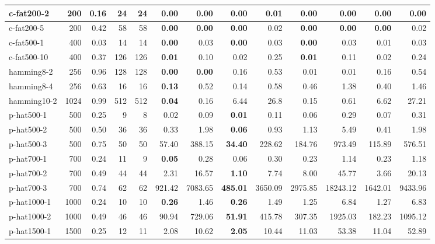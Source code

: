 \begin{table}
{\begin{tabular}{|l|r|r|r|r|r|r|r|r||r|r|r|r|}
    c-fat200-2 & 200 &0.16& 24 & 24&\textbf{0.00} & \textbf{0.00} & \textbf{0.00} & 0.01 & \textbf{0.00} & \textbf{0.00} & \textbf{0.00} & \textbf{0.00} \\ \hline
    c-fat200-5 & 200 &0.42& 58 & 58&\textbf{0.00} & \textbf{0.00} & \textbf{0.00} & 0.02 & \textbf{0.00} & \textbf{0.00} & \textbf{0.00} & 0.02 \\ \hline
    c-fat500-1 & 400 &0.03& 14 & 14&\textbf{0.00} & 0.03 & \textbf{0.00} & 0.03 & \textbf{0.00} & 0.03 & 0.01 & 0.03 \\ \hline
    c-fat500-10 & 400 &0.37& 126 &126&\textbf{0.01} & 0.10 & 0.02 & 0.25 & \textbf{0.01} & 0.11 & 0.02 & 0.24 \\ \hline
    hamming8-2 & 256 &0.96& 128 & 128&\textbf{0.00} & \textbf{0.00} & 0.16 & 0.53 & 0.01 & 0.01 & 0.16 & 0.54 \\ \hline
    hamming8-4 & 256 &0.63& 16 & 16&\textbf{0.13} & 0.52 & 0.14 & 0.58 & 0.46 & 1.38 & 0.40 & 1.46 \\ \hline
    hamming10-2 & 1024&0.99& 512 &512& \textbf{0.04} & 0.16 & 6.44 & 26.8 & 0.15 & 0.61 & 6.62 & 27.21 \\ \hline
    p-hat500-1 & 500 &0.25& 9 & 8& 0.02 & 0.09 & \textbf{0.01} & 0.11 & 0.06 & 0.29 & 0.07 & 0.31 \\ \hline
    p-hat500-2 & 500 &0.50& 36 & 36&0.33 & 1.98 & \textbf{0.06} & 0.93 & 1.13 & 5.49 & 0.41 & 1.98 \\ \hline
    p-hat500-3 & 500 &0.75& 50 &50& 57.40 & 388.15 & \textbf{34.40} & 228.62 & 184.76 & 973.49 & 115.89 & 576.51 \\ \hline
    p-hat700-1 & 700 &0.24& 11 & 9& \textbf{0.05} & 0.28 & 0.06 & 0.30 & 0.23 & 1.14 & 0.23 & 1.18 \\ \hline
    p-hat700-2 & 700 &0.49& 44 & 44&2.31 & 16.57 & \textbf{1.10} & 7.74 &  8.00 & 45.77 & 3.66 & 20.13 \\ \hline
    p-hat700-3 & 700 &0.74& 62 & 62&921.42 & 7083.65 & \textbf{485.01} & 3650.09 & 2975.85 & 18243.12 & 1642.01 & 9433.96 \\ \hline
    p-hat1000-1 & 1000 &0.24& 10 & 10&\textbf{0.26} & 1.46 & \textbf{0.26} & 1.49 & 1.25 & 6.84 & 1.27 & 6.83 \\ \hline
    p-hat1000-2 & 1000 &0.49& 46 & 46&90.94 & 729.06 & \textbf{51.91} & 415.78 & 307.35 & 1925.03 & 182.23 & 1095.12 \\ \hline
    p-hat1500-1 & 1500 &0.25& 12 & 11&2.08 & 10.62 & \textbf{2.05} & 10.44 & 11.03 & 53.38 & 11.04 & 52.89 \\ \hline

\end{tabular}}
\end{table}
